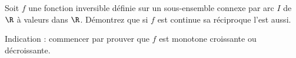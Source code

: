
\begin{exercice}\label{exo0097}

Soit $f$ une fonction inversible définie sur un sous-ensemble connexe par arc $I$ de $\R$ à valeurs dans $\R$. Démontrez que si $f$ est continue sa réciproque l'est aussi.

Indication : commencer par prouver que $f$ est monotone croissante ou décroissante.

\end{exercice}
